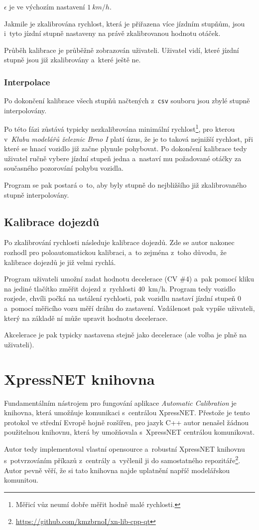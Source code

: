 $\epsilon$ je ve výchozím nastavení $1\ km/h$.

Jakmile je zkalibrována rychlost, která je přiřazena více jízdním stupňům,
jsou i~tyto jízdní stupně nastaveny na právě zkalibrovanou hodnotu otáček.

Průběh kalibrace je průběžně zobrazován uživateli. Uživatel vidí, které
jízdní stupně jsou již zkalibrovány a~které ještě ne.

\subsubsection{Interpolace}

Po dokončení kalibrace všech stupňů načtených z~\texttt{csv} souboru jsou zbylé
stupně interpolovány.

Po této fázi zůstává typicky nezkalibrována minimální rychlost\footnote{Měřicí
vůz neumí dobře měřit hodně malé rychlosti.}, pro kterou v~\textit{Klubu
modelářů železnic Brno I} platí úzus, že je to taková nejnižší rychlost, při
které se hnací vozidlo již začne plynule pohybovat. Po dokončení kalibrace tedy
uživatel ručně vybere jízdní stupeň jedna a~nastaví mu požadované otáčky za
současného pozorování pohybu vozidla.

Program se pak postará o~to, aby byly stupně do nejbližšího již zkalibrovaného
stupně interpolovány.

\subsection{Kalibrace dojezdů}

Po zkalibrování rychlosti následuje kalibrace dojezdů. Zde se autor nakonec
rozhodl pro poloautomatickou kalibraci, a~to zejména z~toho důvodu, že kalibrace
dojezdů je již velmi rychlá.

Program uživateli umožní zadat hodnotu decelerace (\gls{CV} \#4) a~pak pomocí
kliku na jediné tlačítko změřit dojezd z~rychlosti $40$~km/h. Program tedy
vozidlo rozjede, chvíli počká na ustálení rychlosti, pak vozidlu nastaví jízdní
stupeň $0$ a~pomocí měřicího vozu měří dráhu do zastavení. Vzdálenost pak
vypíše uživateli, který na základě ní může upravit hodnotu decelerace.

Akcelerace je pak typicky nastavena stejně jako decelerace (ale volba je plně
na uživateli).

\section{XpressNET knihovna}
\label{sec:xn-lib}

Fundamentálním nástrojem pro fungování aplikace \textit{Automatic Calibration}
je knihovna, která umožňuje komunikaci s~centrálou XpressNET. Přestože je tento
protokol ve střední Evropě hojně rozšířen, pro jazyk C++ autor nenašel žádnou
použitelnou knihovnu, která by umožňovala s~XpressNET centrálou komunikovat.

Autor tedy implementoval vlastní opensource a~robustní XpressNET knihovnu
s~potvrzováním příkazů z~centrály a~vyčlenil ji do samostatného
repozitáře\footnote{\url{https://github.com/kmzbrnoI/xn-lib-cpp-qt}}. Autor
pevně věří, že si tato knihovna najde uplatnění napříč modelářskou komunitou.
